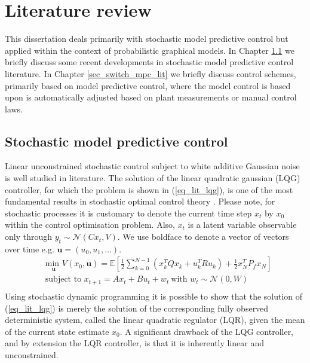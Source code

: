 \chapter{Literature review}
\label{sec_lit_study}
This dissertation deals primarily with stochastic model predictive control but applied within the context of probabilistic graphical models. In Chapter \ref{sec_stoch_mpc_lit} we briefly discuss some recent developments in stochastic model predictive control literature. In Chapter \ref{sec_switch_mpc_lit} we briefly discuss control schemes, primarily  based on model predictive control, where the model control is based upon is automatically adjusted based on plant measurements or manual control laws.

\section{Stochastic model predictive control}
\label{sec_stoch_mpc_lit}
Linear unconstrained stochastic control subject to white additive Gaussian noise is well studied in literature. The solution of the linear quadratic gaussian (LQG) controller, for which the problem is shown in (\ref{eq_lit_lqg}), is one of the most fundamental results in stochastic optimal control theory \cite{lqg}. Please note, for stochastic processes it is customary to denote the current time step $x_t$ by $x_0$ within the control optimisation problem. Also, $x_t$ is a latent variable observable only through $y_t \sim \mathcal{N}(Cx_t, V)$. We use boldface to denote a vector of vectors over time e.g. $\mathbf{u}=(u_0, u_1,...)$.
\begin{equation}
\begin{aligned}
&\underset{\mathbf{u}}{\text{min }} V(x_0, \mathbf{u}) = \mathbb{E}\left[ \frac{1}{2}\sum_{k=0}^{N-1} \left( x_k^TQx_k + u_k^TRu_k \right) + \frac{1}{2}x_N^TP_fx_N \right] \\
& \text{subject to } x_{t+1}=Ax_t+Bu_t + w_t~\text{with } w_t \sim \mathcal{N}(0, W) \\
\end{aligned}
\label{eq_lit_lqg}
\end{equation}
Using stochastic dynamic programming it is possible to show that the solution of (\ref{eq_lit_lqg}) is merely the solution of the corresponding fully observed deterministic system, called the linear quadratic regulator (LQR), given the mean of the current state estimate $x_0$. A significant drawback of the LQG controller, and by extension the LQR controller, is that it is inherently linear and unconstrained.

